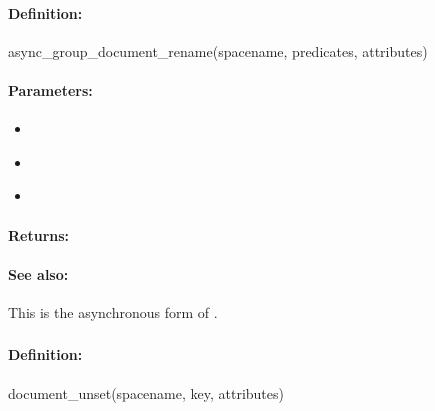 \paragraph{Definition:}
\begin{rubycode}
async_group_document_rename(spacename, predicates, attributes)
\end{rubycode}

\paragraph{Parameters:}
\begin{itemize}[noitemsep]
\item {}\\

\item {}\\

\item {}\\

\end{itemize}

\paragraph{Returns:}


\paragraph{See also:}  This is the asynchronous form of .

\pagebreak
\subsubsection{}
\label{api:ruby:document_unset}


\paragraph{Definition:}
\begin{rubycode}
document_unset(spacename, key, attributes)
\end{rubycode}

